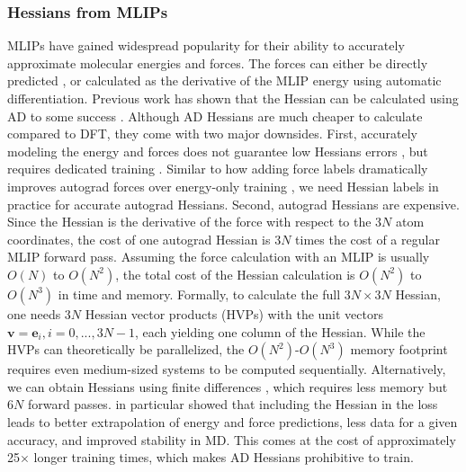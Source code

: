 \documentclass[pdflatex,sn-mathphys-num]{sn-jnl}%
\theoremstyle{thmstyleone}%
\theoremstyle{thmstyletwo}%
\theoremstyle{thmstylethree}%
\begin{document}
\begin{appendices}
\subsubsection{Hessians from MLIPs}
MLIPs have gained widespread popularity for their ability to accurately approximate molecular energies and forces. The forces can either be directly predicted \citep{gasteiger2021, liao2023equiformerv2}, or calculated as the derivative of the MLIP energy using automatic differentiation. %
Previous work has shown that the Hessian can be calculated using AD to some success \citep{yang2024, yuan2024, gonnheimer2025, rodriguez2025, williams2025, cui2025horm}. 
Although AD Hessians are much cheaper to calculate compared to DFT, they come with two major downsides.
First, accurately modeling the energy and forces does not guarantee low Hessians errors \citep{yuan2024}, but requires dedicated training \citep{zhao2025, cui2025horm}. 
Similar to how adding force labels dramatically improves autograd forces over energy-only training \cite{christensen2020forces}, we need Hessian labels in practice for accurate autograd Hessians.
Second, autograd Hessians are expensive.
Since the Hessian is the derivative of the force with respect to the $3N$ atom coordinates, the cost of one autograd Hessian is $3N$ times the cost of a regular MLIP forward pass.
Assuming the force calculation with an MLIP is usually $O(N)$ to $O(N^2)$, the total cost of the Hessian calculation is $O(N^2)$ to $O(N^3)$ in time and memory. 
Formally, to calculate the full $3N\times 3N$ Hessian, one needs $3N$ Hessian vector products (HVPs) with the unit vectors $\mathbf{v} = \mathbf{e}_i, i=0,...,3N-1$, each yielding one column of the Hessian. 
While the HVPs can theoretically be parallelized, the $O(N^2)$-$O(N^3)$ memory footprint requires even medium-sized systems to be computed sequentially.
Alternatively, we can obtain Hessians using finite differences \citep{gonnheimer2025, fu2025, wander2025accessing}, which requires less memory but $6N$ forward passes.
\cite{rodriguez2025} in particular showed that including the Hessian in the loss leads to better extrapolation of energy and force predictions, less data for a given accuracy, and improved stability in MD. This comes at the cost of approximately 25$\times$ longer training times, which makes AD Hessians prohibitive to train.


\end{appendices}
\end{document}
